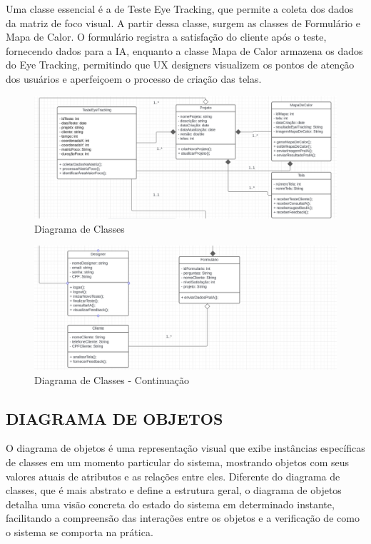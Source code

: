Uma classe essencial é a de Teste Eye Tracking, que permite a coleta dos dados da matriz de foco visual. A partir dessa classe, surgem as classes de Formulário e Mapa de Calor. O formulário registra a satisfação do cliente após o teste, fornecendo dados para a IA, enquanto a classe Mapa de Calor armazena os dados do Eye Tracking, permitindo que UX designers visualizem os pontos de atenção dos usuários e aperfeiçoem o processo de criação das telas.\newline

\begin{figure}[H]
    \centering
    \caption{Diagrama de Classes}%
    \label{fig:pg-classes}
    \includegraphics[width=0.72\linewidth]{Illustrations/classes1.png}
\end{figure}

\vspace{12pt}

\begin{figure}[H]
    \centering
    \caption{Diagrama de Classes - Continuação}%
    \label{fig:pg-classes2}
    \includegraphics[width=0.72\linewidth]{Illustrations/classes2.png}
\end{figure}

\subsection*{DIAGRAMA DE OBJETOS}
O diagrama de objetos é uma representação visual que exibe instâncias específicas de classes em um momento particular do sistema, mostrando objetos com seus valores atuais de atributos e as relações entre eles. Diferente do diagrama de classes, que é mais abstrato e define a estrutura geral, o diagrama de objetos detalha uma visão concreta do estado do sistema em determinado instante, facilitando a compreensão das interações entre os objetos e a verificação de como o sistema se comporta na prática.

